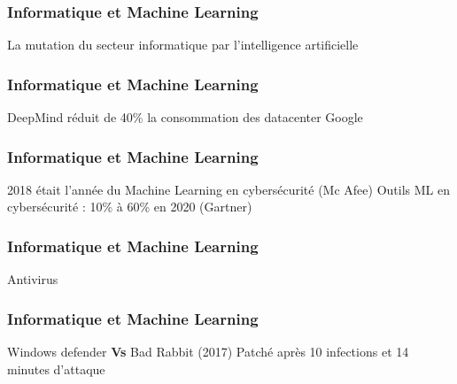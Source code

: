 \begin{frame}
  \frametitle{Informatique et Machine Learning}
  La mutation du secteur informatique par l'intelligence artificielle
\end{frame}

\begin{frame}
  \frametitle{Informatique et Machine Learning}
  DeepMind réduit de 40\% la consommation des datacenter Google
\end{frame}

\begin{frame}
  \frametitle{Informatique et Machine Learning}
  2018 était l'année du Machine Learning en cybersécurité (Mc Afee)
  \newline
  Outils ML en cybersécurité : 10\% à 60\% en 2020 (Gartner)
\end{frame}

\begin{frame}
  \frametitle{Informatique et Machine Learning}
  Antivirus 
  \newline
  \newline
  \begin{minipage}[c]{0.49\linewidth}
  \end{minipage}\hfill
  \begin{minipage}[c]{0.49\linewidth}
  \end{minipage}\hfill
\end{frame}

\begin{frame}
  \frametitle{Informatique et Machine Learning}
  Windows defender \textbf{Vs} Bad Rabbit (2017)
  \newline
  Patché après 10 infections et 14 minutes d'attaque
  \newline
  \newline
  \begin{minipage}[c]{0.49\linewidth}
  \end{minipage}\hfill
  \begin{minipage}[c]{0.49\linewidth}
  \end{minipage}\hfill
\end{frame}

